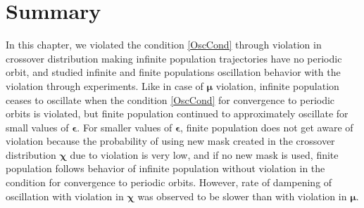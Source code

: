 \section{Summary}
In this chapter, we violated the condition \ref{OscCond} through violation in crossover distribution 
making infinite population trajectories have no periodic orbit, and 
studied infinite and finite populations oscillation behavior with the violation through experiments. 
Like in case of $\bm{\mu}$ violation, infinite population ceases to oscillate when the condition \ref{OscCond} for convergence to 
periodic orbits is violated, but finite population continued to approximately oscillate for small values of $\bm{\epsilon}$. 
For smaller values of $\bm{\epsilon}$, finite population does not get aware of violation because the probability of using 
new mask created in the crossover distribution $\bm{\chi}$ due to violation is very low, and 
if no new mask is used, finite population follows behavior of infinite population without violation in the condition for convergence to 
periodic orbits. However, rate of dampening of oscillation with violation 
in $\bm{\chi}$ was observed to be slower than with violation in ${\bm{\mu}}$.

